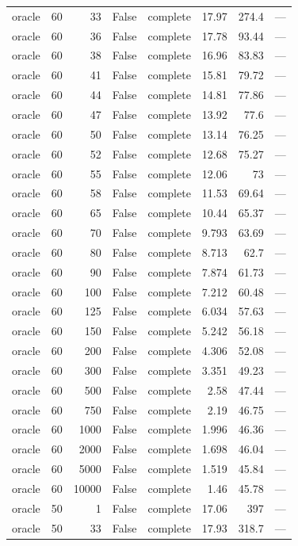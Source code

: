 \begin{tabular}{lrrrlrrl}
oracle & 60 & 33 & False & complete & 17.97 & 274.4 & — \\
oracle & 60 & 36 & False & complete & 17.78 & 93.44 & — \\
oracle & 60 & 38 & False & complete & 16.96 & 83.83 & — \\
oracle & 60 & 41 & False & complete & 15.81 & 79.72 & — \\
oracle & 60 & 44 & False & complete & 14.81 & 77.86 & — \\
oracle & 60 & 47 & False & complete & 13.92 & 77.6 & — \\
oracle & 60 & 50 & False & complete & 13.14 & 76.25 & — \\
oracle & 60 & 52 & False & complete & 12.68 & 75.27 & — \\
oracle & 60 & 55 & False & complete & 12.06 & 73 & — \\
oracle & 60 & 58 & False & complete & 11.53 & 69.64 & — \\
oracle & 60 & 65 & False & complete & 10.44 & 65.37 & — \\
oracle & 60 & 70 & False & complete & 9.793 & 63.69 & — \\
oracle & 60 & 80 & False & complete & 8.713 & 62.7 & — \\
oracle & 60 & 90 & False & complete & 7.874 & 61.73 & — \\
oracle & 60 & 100 & False & complete & 7.212 & 60.48 & — \\
oracle & 60 & 125 & False & complete & 6.034 & 57.63 & — \\
oracle & 60 & 150 & False & complete & 5.242 & 56.18 & — \\
oracle & 60 & 200 & False & complete & 4.306 & 52.08 & — \\
oracle & 60 & 300 & False & complete & 3.351 & 49.23 & — \\
oracle & 60 & 500 & False & complete & 2.58 & 47.44 & — \\
oracle & 60 & 750 & False & complete & 2.19 & 46.75 & — \\
oracle & 60 & 1000 & False & complete & 1.996 & 46.36 & — \\
oracle & 60 & 2000 & False & complete & 1.698 & 46.04 & — \\
oracle & 60 & 5000 & False & complete & 1.519 & 45.84 & — \\
oracle & 60 & 10000 & False & complete & 1.46 & 45.78 & — \\
oracle & 50 & 1 & False & complete & 17.06 & 397 & — \\
oracle & 50 & 33 & False & complete & 17.93 & 318.7 & — \\

\end{tabular}
